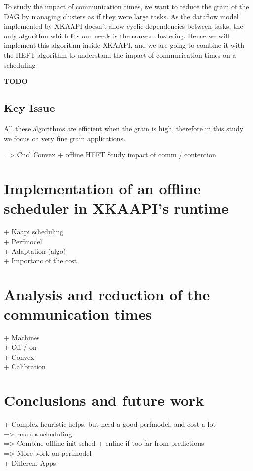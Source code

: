\documentclass[10pt, conference, compsocconf]{IEEEtran}
\begin{document}
To study the impact of communication times, we want to reduce the grain of
the DAG by managing clusters as if they were large tasks. As  the dataflow
model implemented by XKAAPI doesn't allow cyclic dependencies between tasks,
the only algorithm which fits our needs is the convex clustering. Hence we
will implement this algorithm inside XKAAPI, and we are going to combine it
with the HEFT algorithm to understand the impact of communication times on a
scheduling. 

\textbf{TODO}
\\

\subsection{Key Issue}
All these algorithms are efficient when the grain is high, therefore in this study we
focus on very fine grain applications. 

=> Cncl Convex + offline HEFT Study impact of comm / contention

\section{Implementation of an offline scheduler in XKAAPI's runtime}
+ Kaapi scheduling
\\
+ Perfmodel 
\\
+ Adaptation (algo)
\\
+ Importanc of the cost
\section{Analysis and reduction of the communication times}
+ Machines
\\
+ Off / on
\\
+ Convex
\\
+ Calibration
\section{Conclusions and future work}
+ Complex heuristic helps, but need a good perfmodel, and cost a lot
\\
=> reuse a scheduling 
\\
=> Combine offline init sched + online if too far from predictions
\\
=> More work on perfmodel
\\
+ Different Apps








\end{document}
